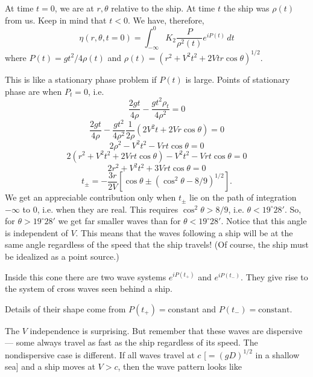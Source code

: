 \sourcepagebreak


At time $t=0$, we are at $r,\theta$ relative to the ship. At time $t$ the ship was $\rho(t)$ from us.
Keep in mind that $t<0$. We have, therefore,
\[
	\eta(r,\theta,t=0)=\int_{-\infty}^{0}K_2\frac{P}{\rho^2(t)}e^{iP(t)}\,dt
\]
where $P(t)=gt^2/4\rho(t)$ and
$\rho(t)=(r^2+V^2t^2+2Vtr\cos\theta)^{1/2}$.

This is like a stationary phase problem if $P(t)$ is large. Points of stationary
phase are when $P_t=0$, i.e.
\[
	\frac{2gt}{4\rho}-\frac{gt^2\rho_t}{4\rho^2}=0
\]
\[
	\frac{2gt}{4\rho}-\frac{gt^2}{4\rho^2}\frac{1}{2\rho}
	(2V^2t+2Vr\cos\theta)=0
\]
\[
	2\rho^2-V^2t^2-Vrt\cos\theta=0
\]
\[
	2(r^2+V^2t^2+2Vrt\cos\theta)-V^2t^2-Vrt\cos\theta=0
\]
\[
	2r^2+V^2t^2+3Vrt\cos\theta=0
\]
\[
	t_\pm=-\frac{3r}{2V}
	\left[\cos\theta\pm(\cos^2\theta-8/9)^{1/2}\right].
\]
We get an appreciable contribution only when $t_\pm$ lie on the path of integration $-\infty$ to
0, i.e. when they are real. This requires $\cos^2\theta>8/9$, i.e. $\theta<19^\circ28'$. So, for $\theta>19^\circ28'$
we get far smaller waves than for $\theta<19^\circ28'$. Notice that this angle is independent of
$V$. This means that the waves following a ship will be at the same angle regardless of
the speed that the ship travels! (Of course, the ship must be idealized as a point
source.)

\sourcepagebreak

Inside this cone there are two wave systems $e^{iP(t_+)}$ and $e^{iP(t_-)}$. They give rise to
the system of cross waves seen behind a ship.


Details of their shape come from $P(t_+)=\text{constant}$ and $P(t_-)=\text{constant}$.

The $V$ independence is surprising. But remember that these waves are
dispersive --- some always travel as fast as the ship regardless of its speed. The
nondispersive case is different. If all waves travel at $c$ [$=(gD)^{1/2}$ in a shallow sea] and
a ship moves at $V>c$, then the wave pattern looks like


